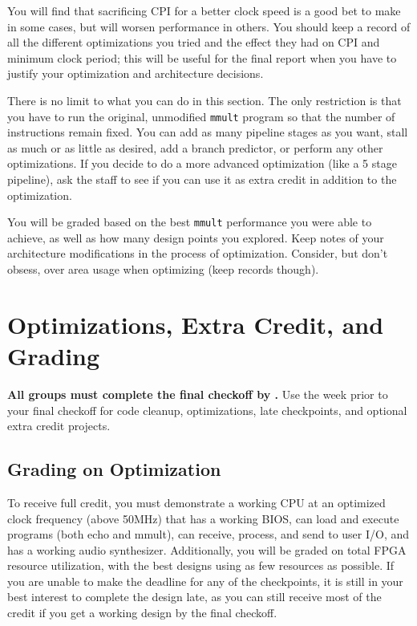 \documentclass[11pt]{article}
\begin{document}
You will find that sacrificing CPI for a better clock speed is a good bet to make in some cases, but will worsen performance in others. You should keep a record of all the different optimizations you tried and the effect they had on CPI and minimum clock period; this will be useful for the final report when you have to justify your optimization and architecture decisions.

There is no limit to what you can do in this section. The only restriction is that you have to run the original, unmodified \verb|mmult| program so that the number of instructions remain fixed. You can add as many pipeline stages as you want, stall as much or as little as desired, add a branch predictor, or perform any other optimizations. If you decide to do a more advanced optimization (like a 5 stage pipeline), ask the staff to see if you can use it as extra credit in addition to the optimization.

You will be graded based on the best \verb|mmult| performance you were able to achieve, as well as how many design points you explored.
Keep notes of your architecture modifications in the process of optimization.
Consider, but don't obsess, over area usage when optimizing (keep records though).

\pagebreak

\section{Optimizations, Extra Credit, and Grading}
\textbf{All groups must complete the final checkoff by \finalCheckoffDueDate.} Use the week prior to your final checkoff for code cleanup, optimizations, late checkpoints, and optional extra credit projects.

\subsection{Grading on Optimization}

To receive full credit, you must demonstrate a working CPU at an optimized clock frequency (above 50MHz) that has a working BIOS, can load and execute programs (both echo and mmult), can receive, process, and send to user I/O, and has a working audio synthesizer. Additionally, you will be graded on total FPGA resource utilization, with the best designs using as few resources as possible. If you are unable to make the deadline for any of the checkpoints, it is still in your best interest to complete the design late, as you can still receive most of the credit if you get a working design by the final checkoff.
\end{document}
